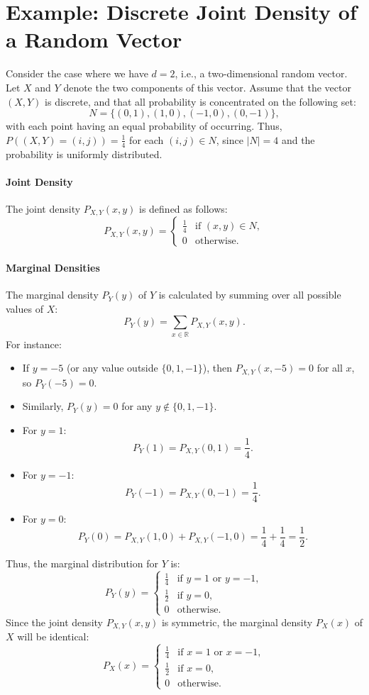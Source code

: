 \section{Example: Discrete Joint Density of a Random Vector}
Consider the case where we have \( d = 2 \), i.e., a two-dimensional random vector. Let \( X \) and \( Y \) denote the two components of this vector. Assume that the vector \( (X, Y) \) is discrete, and that all probability is concentrated on the following set:
\[
N = \{ (0, 1), (1, 0), (-1, 0), (0, -1) \},
\]
with each point having an equal probability of occurring. Thus, \( P((X, Y) = (i, j)) = \frac{1}{4} \) for each \( (i, j) \in N \), since \( |N| = 4 \) and the probability is uniformly distributed.

\paragraph{Joint Density}
The joint density \( P_{X,Y}(x, y) \) is defined as follows:
\[
P_{X,Y}(x, y) = \begin{cases}
\frac{1}{4} & \text{if } (x, y) \in N, \\
0 & \text{otherwise}.
\end{cases}
\]

\paragraph{Marginal Densities}
The marginal density \( P_Y(y) \) of \( Y \) is calculated by summing over all possible values of \( X \):
\[
P_Y(y) = \sum_{x \in \mathbb{R}} P_{X,Y}(x, y).
\]
For instance:
\begin{itemize}
    \item If \( y = -5 \) (or any value outside \( \{0, 1, -1\} \)), then \( P_{X,Y}(x, -5) = 0 \) for all \( x \), so \( P_Y(-5) = 0 \).
    \item Similarly, \( P_Y(y) = 0 \) for any \( y \notin \{0, 1, -1\} \).
    \item For \( y = 1 \):
  \[
  P_Y(1) = P_{X,Y}(0, 1) = \frac{1}{4}.
  \]
    \item For \( y = -1 \):
  \[
  P_Y(-1) = P_{X,Y}(0, -1) = \frac{1}{4}.
  \]
    \item For \( y = 0 \):
  \[
  P_Y(0) = P_{X,Y}(1, 0) + P_{X,Y}(-1, 0) = \frac{1}{4} + \frac{1}{4} = \frac{1}{2}.
  \]
\end{itemize}
Thus, the marginal distribution for \( Y \) is:
\[
P_Y(y) = \begin{cases}
\frac{1}{4} & \text{if } y = 1 \text{ or } y = -1, \\
\frac{1}{2} & \text{if } y = 0, \\
0 & \text{otherwise}.
\end{cases}
\]
Since the joint density \( P_{X,Y}(x, y) \) is symmetric, the marginal density \( P_X(x) \) of \( X \) will be identical:
\[
P_X(x) = \begin{cases}
\frac{1}{4} & \text{if } x = 1 \text{ or } x = -1, \\
\frac{1}{2} & \text{if } x = 0, \\
0 & \text{otherwise}.
\end{cases}
\]

